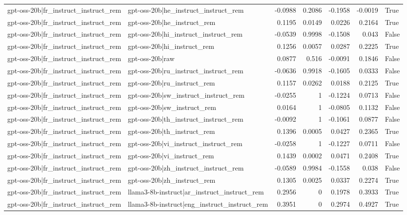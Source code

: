 \begin{table}
\begin{tabular}{l l r r r r l}
gpt-oss-20b|fr_instruct_instruct_rem & gpt-oss-20b|he_instruct_instruct_rem & -0.0988 & 0.2086 & -0.1958 & -0.0019 & True \\
gpt-oss-20b|fr_instruct_instruct_rem & gpt-oss-20b|he_instruct_rem & 0.1195 & 0.0149 & 0.0226 & 0.2164 & True \\
gpt-oss-20b|fr_instruct_instruct_rem & gpt-oss-20b|hi_instruct_instruct_rem & -0.0539 & 0.9998 & -0.1508 & 0.043 & False \\
gpt-oss-20b|fr_instruct_instruct_rem & gpt-oss-20b|hi_instruct_rem & 0.1256 & 0.0057 & 0.0287 & 0.2225 & True \\
gpt-oss-20b|fr_instruct_instruct_rem & gpt-oss-20b|raw & 0.0877 & 0.516 & -0.0091 & 0.1846 & False \\
gpt-oss-20b|fr_instruct_instruct_rem & gpt-oss-20b|ru_instruct_instruct_rem & -0.0636 & 0.9918 & -0.1605 & 0.0333 & False \\
gpt-oss-20b|fr_instruct_instruct_rem & gpt-oss-20b|ru_instruct_rem & 0.1157 & 0.0262 & 0.0188 & 0.2125 & True \\
gpt-oss-20b|fr_instruct_instruct_rem & gpt-oss-20b|sw_instruct_instruct_rem & -0.0255 & 1 & -0.1224 & 0.0713 & False \\
gpt-oss-20b|fr_instruct_instruct_rem & gpt-oss-20b|sw_instruct_rem & 0.0164 & 1 & -0.0805 & 0.1132 & False \\
gpt-oss-20b|fr_instruct_instruct_rem & gpt-oss-20b|th_instruct_instruct_rem & -0.0092 & 1 & -0.1061 & 0.0877 & False \\
gpt-oss-20b|fr_instruct_instruct_rem & gpt-oss-20b|th_instruct_rem & 0.1396 & 0.0005 & 0.0427 & 0.2365 & True \\
gpt-oss-20b|fr_instruct_instruct_rem & gpt-oss-20b|vi_instruct_instruct_rem & -0.0258 & 1 & -0.1227 & 0.0711 & False \\
gpt-oss-20b|fr_instruct_instruct_rem & gpt-oss-20b|vi_instruct_rem & 0.1439 & 0.0002 & 0.0471 & 0.2408 & True \\
gpt-oss-20b|fr_instruct_instruct_rem & gpt-oss-20b|zh_instruct_instruct_rem & -0.0589 & 0.9984 & -0.1558 & 0.038 & False \\
gpt-oss-20b|fr_instruct_instruct_rem & gpt-oss-20b|zh_instruct_rem & 0.1305 & 0.0025 & 0.0337 & 0.2274 & True \\
gpt-oss-20b|fr_instruct_instruct_rem & llama3-8b-instruct|ar_instruct_instruct_rem & 0.2956 & 0 & 0.1978 & 0.3933 & True \\
gpt-oss-20b|fr_instruct_instruct_rem & llama3-8b-instruct|eng_instruct_instruct_rem & 0.3951 & 0 & 0.2974 & 0.4927 & True \\

\end{tabular}
\end{table}
